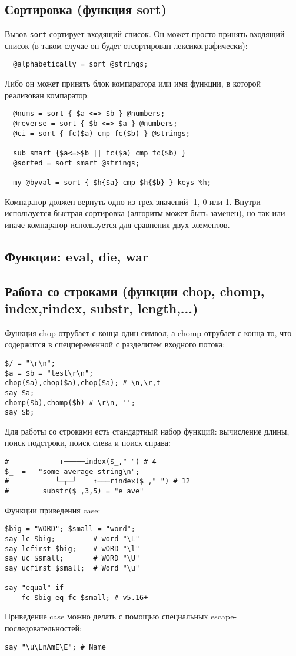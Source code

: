 \subsection{Сортировка (функция sort)}
  Вызов \verb|sort| сортирует входящий список. Он может просто принять входящий список (в таком случае он будет отсортирован лексикографически):
  \begin{verbatim}
  @alphabetically = sort @strings;
  \end{verbatim}
  Либо он может принять блок компаратора или имя функции, в которой реализован компаратор:
  \begin{verbatim}
  @nums = sort { $a <=> $b } @numbers;
  @reverse = sort { $b <=> $a } @numbers;
  @ci = sort { fc($a) cmp fc($b) } @strings;

  sub smart {$a<=>$b || fc($a) cmp fc($b) }
  @sorted = sort smart @strings;

  my @byval = sort { $h{$a} cmp $h{$b} } keys %h;
  \end{verbatim}
  Компаратор должен вернуть одно из трех значений -1, 0 или 1. Внутри используется быстрая сортировка (алгоритм может быть заменен), но так или иначе компаратор используется для сравнения двух элементов.

\subsection{Функции: eval, die, war} %

\subsection{Работа со строками %
  (функции chop, chomp, index,rindex, substr, length,...)}
Функция chop отрубает с конца один символ, а chomp отрубает с конца то, что содержится в спецпеременной с разделитем входного потока:
\begin{verbatim}
$/ = "\r\n";
$a = $b = "test\r\n";
chop($a),chop($a),chop($a); # \n,\r,t
say $a;
chomp($b),chomp($b) # \r\n, '';
say $b;
\end{verbatim}
Для работы со строками есть стандартный набор функций: вычисление длины, поиск подстроки, поиск слева и поиск справа:
\begin{verbatim}
#            ↓─────index($_," ") # 4
$_  =   "some average string\n";
#           └─┬─┘    ↑───rindex($_," ") # 12
#        substr($_,3,5) = "e ave"
\end{verbatim}
Функции приведения case:
\begin{verbatim}
$big = "WORD"; $small = "word";
say lc $big;         # word "\L"
say lcfirst $big;    # wORD "\l"
say uc $small;       # WORD "\U"
say ucfirst $small;  # Word "\u"

say "equal" if
    fc $big eq fc $small; # v5.16+
\end{verbatim}
Приведение case можно делать с помощью специальных escape-последовательностей:
\begin{verbatim}
say "\u\LnAmE\E"; # Name
\end{verbatim}

